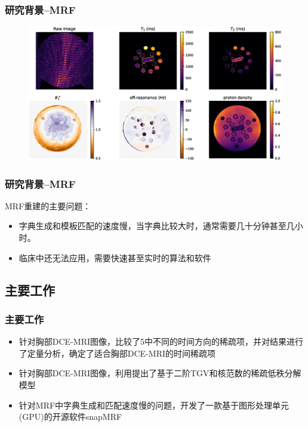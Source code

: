 \documentclass{beamer}
\begin{document}
\begin{frame}
\frametitle{研究背景--MRF}
	\begin{figure}
		\centering
		\includegraphics[width=1\textwidth]{../img/intro/mrfmap}
	\end{figure}
\end{frame}

\begin{frame}
\frametitle{研究背景--MRF}
	MRF重建的主要问题：
	\begin{itemize}
		\item 字典生成和模板匹配的速度慢，当字典比较大时，通常需要几十分钟甚至几小时。
		\item 临床中还无法应用，需要快速甚至实时的算法和软件
	\end{itemize}
\end{frame}

\subsection{主要工作}
\begin{frame}
	\frametitle{主要工作}
	\begin{itemize}
		\item 针对胸部DCE-MRI图像，比较了5中不同的时间方向的稀疏项，并对结果进行了定量分析，确定了适合胸部DCE-MRI的时间稀疏项
		\item 针对胸部DCE-MRI图像，利用提出了基于二阶TGV和核范数的稀疏低秩分解模型
		\item 针对MRF中字典生成和匹配速度慢的问题，开发了一款基于图形处理单元(GPU)的开源软件snapMRF
	\end{itemize}
\end{frame}
\end{document}
